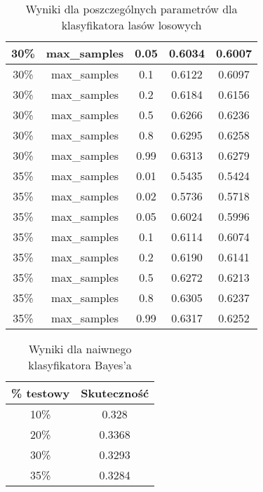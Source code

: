 \documentclass{classrep}
\begin{document}
{{{\begin{table}[!htbp]
\begin{tabular}{|c|c|c|c|c|}
                        30\% & max\_samples & 0.05 & 0.6034 & 0.6007 \\ \hline
                        30\% & max\_samples & 0.1 & 0.6122 & 0.6097 \\ \hline
                        30\% & max\_samples & 0.2 & 0.6184 & 0.6156 \\ \hline
                        30\% & max\_samples & 0.5 & 0.6266 & 0.6236 \\ \hline
                        30\% & max\_samples & 0.8 & 0.6295 & 0.6258 \\ \hline
                        30\% & max\_samples & 0.99 & 0.6313 & 0.6279 \\ \hline
                        35\% & max\_samples & 0.01 & 0.5435 & 0.5424 \\ \hline
                        35\% & max\_samples & 0.02 & 0.5736 & 0.5718 \\ \hline
                        35\% & max\_samples & 0.05 & 0.6024 & 0.5996 \\ \hline
                        35\% & max\_samples & 0.1 & 0.6114 & 0.6074 \\ \hline
                        35\% & max\_samples & 0.2 & 0.6190 & 0.6141 \\ \hline
                        35\% & max\_samples & 0.5 & 0.6272 & 0.6213 \\ \hline
                        35\% & max\_samples & 0.8 & 0.6305 & 0.6237 \\ \hline
                        35\% & max\_samples & 0.99 & 0.6317 & 0.6252 \\ \hline
                    \end{tabular}
                    \caption{Wyniki dla poszczególnych parametrów dla klasyfikatora lasów losowych}
                    \label{tab:params_forest_2}
                \end{table}
                \FloatBarrier
            }

            \begin{table}[!htbp]
                \begin{tabular}{|c|c|}
                    \hline
                    \% testowy & Skuteczność \\ \hline
                    10\% & 0.328 \\ \hline
                    20\% & 0.3368 \\ \hline
                    30\% & 0.3293 \\ \hline
                    35\% & 0.3284 \\ \hline
                \end{tabular}
                \caption{Wyniki dla naiwnego klasyfikatora Bayes'a}
                \label{tab:params_bayes}
            \end{table}
            \FloatBarrier

}}
\end{document}
